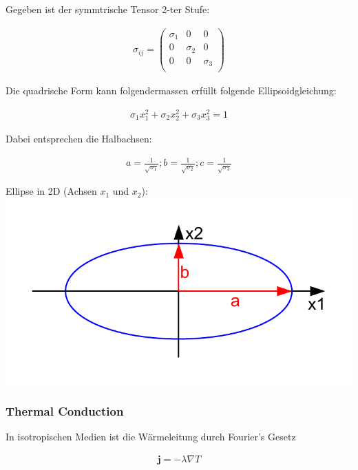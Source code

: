 \documentclass[a4paper]{scrartcl}
\begin{document}
Gegeben ist der symmtrische Tensor 2-ter Stufe:

\begin{align}
\sigma_{ij}=\begin{pmatrix}
\sigma_1 & 0 & 0 \\
0 & \sigma_2 & 0 \\
0 & 0 & \sigma_3 \\
\end{pmatrix}
\end{align}

Die quadrische Form kann folgendermassen erfüllt folgende Ellipsoidgleichung:

\begin{align}
\sigma_1x_1^2+\sigma_2x_2^2+\sigma_3x_3^2=1
\end{align}


Dabei entsprechen die Halbachsen:

\begin{align}
a=\frac{1}{\sqrt{\sigma_1}}; b=\frac{1}{\sqrt{\sigma_2}};
c=\frac{1}{\sqrt{\sigma_3}}
\end{align}

\begin{center}
Ellipse in 2D (Achsen $x_1$ und $x_2$):\\
\includegraphics[scale=0.8]{images/quadrik_2d_ellipse.pdf}
\end{center}

\subsubsection{Thermal Conduction}
In isotropischen Medien ist die Wärmeleitung durch Fourier's Gesetz

\begin{align}
\mathbf{j}=-\lambda \nabla T
\end{align}
\end{document}
